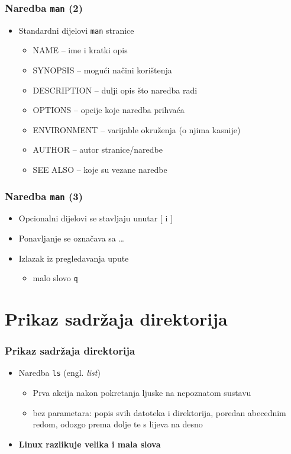 \documentclass{beamer}
\newcommand{\shell}[1]{\texttt{#1}}
\begin{document}
\begin{frame}[t]
\frametitle{Naredba \shell{man} (2)}
\begin{itemize}
  \item Standardni dijelovi \shell{man} stranice
  \begin{itemize}
    \item NAME -- ime i kratki opis
    \item SYNOPSIS -- mogući načini korištenja
    \item DESCRIPTION -- dulji opis što naredba radi
    \item OPTIONS -- opcije koje naredba prihvaća
    \item ENVIRONMENT -- varijable okruženja (o njima kasnije)
    \item AUTHOR -- autor stranice/naredbe
    \item SEE ALSO -- koje su vezane naredbe
  \end{itemize}
\end{itemize}
\end{frame}

\begin{frame}[t]
\frametitle{Naredba \shell{man} (3)}
\begin{itemize}
  \item Opcionalni dijelovi se stavljaju unutar $[$ i $]$
  \item Ponavljanje se označava sa \ldots
  \item Izlazak iz pregledavanja upute
  \begin{itemize}
    \item malo slovo \shell{q}
  \end{itemize}
\end{itemize}
\end{frame}

\section{Prikaz sadržaja direktorija}
\begin{frame}[t]
\frametitle{Prikaz sadržaja direktorija}
\begin{itemize}
  \item Naredba \texttt {ls} (engl. \emph{list})
  \begin{itemize}
    \item Prva akcija nakon pokretanja ljuske na nepoznatom sustavu
    \item bez parametara: popis svih datoteka i direktorija, poredan
          abecednim redom, odozgo prema dolje te s lijeva na desno
  \end{itemize}
  \item \textbf {Linux razlikuje velika i mala slova}
\end{itemize}
\end{frame}
\end{document}
